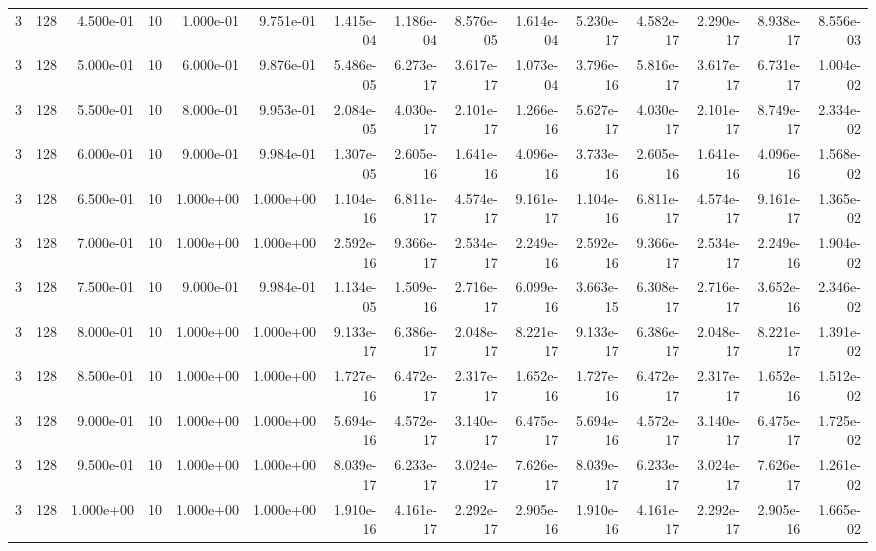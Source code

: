 \begin{tabular}{rrrrrrrrrrrrrrr}
3 & 128 & 4.500e-01 & 10 & 1.000e-01 & 9.751e-01 & 1.415e-04 & 1.186e-04 & 8.576e-05 & 1.614e-04 & 5.230e-17 & 4.582e-17 & 2.290e-17 & 8.938e-17 & 8.556e-03 \\
3 & 128 & 5.000e-01 & 10 & 6.000e-01 & 9.876e-01 & 5.486e-05 & 6.273e-17 & 3.617e-17 & 1.073e-04 & 3.796e-16 & 5.816e-17 & 3.617e-17 & 6.731e-17 & 1.004e-02 \\
3 & 128 & 5.500e-01 & 10 & 8.000e-01 & 9.953e-01 & 2.084e-05 & 4.030e-17 & 2.101e-17 & 1.266e-16 & 5.627e-17 & 4.030e-17 & 2.101e-17 & 8.749e-17 & 2.334e-02 \\
3 & 128 & 6.000e-01 & 10 & 9.000e-01 & 9.984e-01 & 1.307e-05 & 2.605e-16 & 1.641e-16 & 4.096e-16 & 3.733e-16 & 2.605e-16 & 1.641e-16 & 4.096e-16 & 1.568e-02 \\
3 & 128 & 6.500e-01 & 10 & 1.000e+00 & 1.000e+00 & 1.104e-16 & 6.811e-17 & 4.574e-17 & 9.161e-17 & 1.104e-16 & 6.811e-17 & 4.574e-17 & 9.161e-17 & 1.365e-02 \\
3 & 128 & 7.000e-01 & 10 & 1.000e+00 & 1.000e+00 & 2.592e-16 & 9.366e-17 & 2.534e-17 & 2.249e-16 & 2.592e-16 & 9.366e-17 & 2.534e-17 & 2.249e-16 & 1.904e-02 \\
3 & 128 & 7.500e-01 & 10 & 9.000e-01 & 9.984e-01 & 1.134e-05 & 1.509e-16 & 2.716e-17 & 6.099e-16 & 3.663e-15 & 6.308e-17 & 2.716e-17 & 3.652e-16 & 2.346e-02 \\
3 & 128 & 8.000e-01 & 10 & 1.000e+00 & 1.000e+00 & 9.133e-17 & 6.386e-17 & 2.048e-17 & 8.221e-17 & 9.133e-17 & 6.386e-17 & 2.048e-17 & 8.221e-17 & 1.391e-02 \\
3 & 128 & 8.500e-01 & 10 & 1.000e+00 & 1.000e+00 & 1.727e-16 & 6.472e-17 & 2.317e-17 & 1.652e-16 & 1.727e-16 & 6.472e-17 & 2.317e-17 & 1.652e-16 & 1.512e-02 \\
3 & 128 & 9.000e-01 & 10 & 1.000e+00 & 1.000e+00 & 5.694e-16 & 4.572e-17 & 3.140e-17 & 6.475e-17 & 5.694e-16 & 4.572e-17 & 3.140e-17 & 6.475e-17 & 1.725e-02 \\
3 & 128 & 9.500e-01 & 10 & 1.000e+00 & 1.000e+00 & 8.039e-17 & 6.233e-17 & 3.024e-17 & 7.626e-17 & 8.039e-17 & 6.233e-17 & 3.024e-17 & 7.626e-17 & 1.261e-02 \\
3 & 128 & 1.000e+00 & 10 & 1.000e+00 & 1.000e+00 & 1.910e-16 & 4.161e-17 & 2.292e-17 & 2.905e-16 & 1.910e-16 & 4.161e-17 & 2.292e-17 & 2.905e-16 & 1.665e-02 \\
\bottomrule
\end{tabular}
